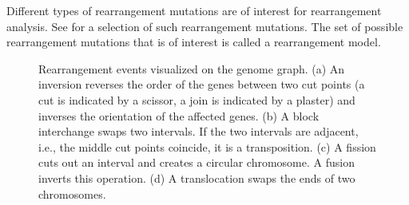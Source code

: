 \documentclass{svmult}
\newcommand{\m}[1]{\mathcal{#1}}
\begin{document}
Different types of rearrangement mutations are of interest for rearrangement analysis. See  for a selection of such rearrangement mutations. The set of possible rearrangement mutations that is of interest is called a rearrangement model. 

\begin{figure}
	\begin{center}
	\quad
	\quad
	\end{center}
	\caption{Rearrangement events visualized on the genome graph. (a) An inversion reverses the order of the 
	genes between two cut points (a cut is indicated by a scissor, a join is
	indicated by a plaster) and inverses the orientation of the affected genes. (b) A block interchange swaps two intervals. If the two intervals are 
	adjacent, i.e., the middle cut points coincide, it is a transposition. (c) A fission cuts out an interval and 
	creates a circular chromosome. 
	A fusion inverts this operation. (d) A translocation swaps the ends of two chromosomes. }
	\label{fig:events}
\end{figure}
\end{document}
